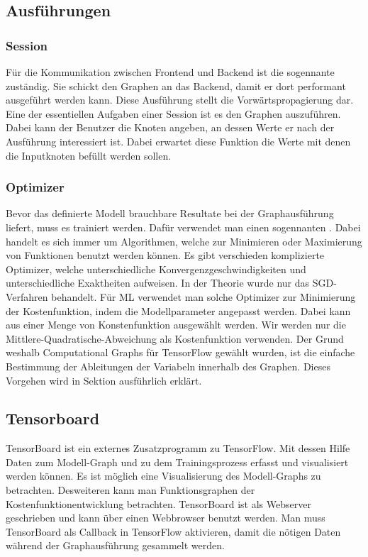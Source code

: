 \subsection{Ausführungen}
\subsubsection{Session}
Für die Kommunikation zwischen Frontend und Backend ist die sogennante
 zuständig. Sie schickt den Graphen an das Backend, damit er
dort performant ausgeführt werden kann. Diese Ausführung stellt die
Vorwärtspropagierung dar.
\para{}
Eine der essentiellen Aufgaben einer Session ist es den Graphen auszuführen.
Dabei kann der Benutzer die Knoten angeben, an dessen Werte er nach der
Ausführung interessiert ist.
Dabei erwartet diese Funktion die Werte mit denen die
Inputknoten befüllt werden sollen.


\subsubsection{Optimizer}
Bevor das definierte Modell brauchbare Resultate bei der Graphausführung liefert,
muss es trainiert werden. Dafür verwendet man einen sogennanten .
Dabei handelt es sich immer um Algorithmen, welche zur Minimieren oder
Maximierung von Funktionen benutzt werden können.
Es gibt verschieden komplizierte Optimizer, welche unterschiedliche
Konvergenzgeschwindigkeiten und unterschiedliche Exaktheiten aufweisen. In der
Theorie wurde nur das SGD-Verfahren behandelt.
\para{}
Für ML verwendet man solche Optimizer zur Minimierung der Kostenfunktion, indem die Modellparameter
angepasst werden. Dabei kann aus einer Menge von Konstenfunktion ausgewählt
werden. Wir werden nur die Mittlere-Quadratische-Abweichung als Kostenfunktion verwenden.
\para{}
Der Grund weshalb Computational Graphs für TensorFlow gewählt wurden, ist die
einfache Bestimmung der Ableitungen der Variabeln innerhalb des Graphen.
Dieses Vorgehen wird in Sektion  ausführlich erklärt.

\subsection{Tensorboard}
TensorBoard ist ein externes Zusatzprogramm zu TensorFlow. Mit dessen Hilfe
Daten zum Modell-Graph und zu dem Trainingsprozess erfasst
und visualisiert werden können.
Es ist möglich eine Visualisierung des Modell-Graphs zu betrachten. Desweiteren
kann man Funktionsgraphen der Kostenfunktionentwicklung betrachten.
\para{}
TensorBoard ist als Webserver geschrieben und kann über einen Webbrowser
benutzt werden.
Man muss TensorBoard als Callback in TensorFlow aktivieren, damit die
nötigen Daten während der Graphausführung gesammelt werden.

